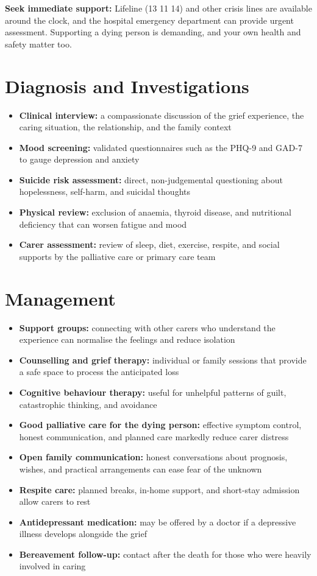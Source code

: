 \textbf{Seek immediate support:} Lifeline (13 11 14) and other crisis lines are available around the clock, and the hospital emergency department can provide urgent assessment. Supporting a dying person is demanding, and your own health and safety matter too.

\section*{Diagnosis and Investigations}
\begin{itemize}
    \item \textbf{Clinical interview:} a compassionate discussion of the grief experience, the caring situation, the relationship, and the family context
    \item \textbf{Mood screening:} validated questionnaires such as the PHQ-9 and GAD-7 to gauge depression and anxiety
    \item \textbf{Suicide risk assessment:} direct, non-judgemental questioning about hopelessness, self-harm, and suicidal thoughts
    \item \textbf{Physical review:} exclusion of anaemia, thyroid disease, and nutritional deficiency that can worsen fatigue and mood
    \item \textbf{Carer assessment:} review of sleep, diet, exercise, respite, and social supports by the palliative care or primary care team
\end{itemize}

\section*{Management}
\begin{itemize}
    \item \textbf{Support groups:} connecting with other carers who understand the experience can normalise the feelings and reduce isolation
    \item \textbf{Counselling and grief therapy:} individual or family sessions that provide a safe space to process the anticipated loss
    \item \textbf{Cognitive behaviour therapy:} useful for unhelpful patterns of guilt, catastrophic thinking, and avoidance
    \item \textbf{Good palliative care for the dying person:} effective symptom control, honest communication, and planned care markedly reduce carer distress
    \item \textbf{Open family communication:} honest conversations about prognosis, wishes, and practical arrangements can ease fear of the unknown
    \item \textbf{Respite care:} planned breaks, in-home support, and short-stay admission allow carers to rest
    \item \textbf{Antidepressant medication:} may be offered by a doctor if a depressive illness develops alongside the grief
    \item \textbf{Bereavement follow-up:} contact after the death for those who were heavily involved in caring
\end{itemize}

